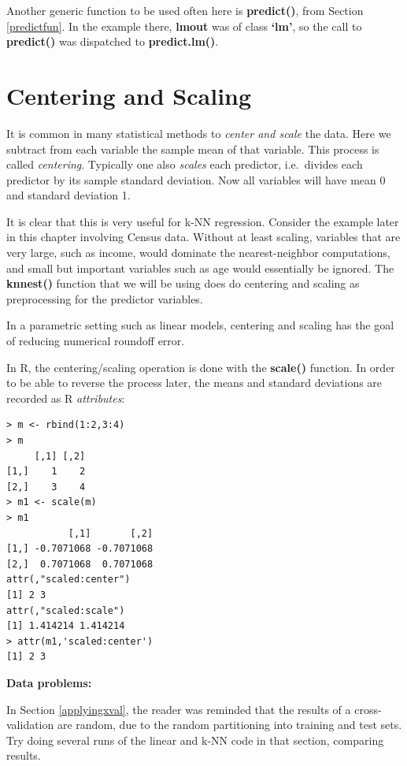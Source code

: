 Another generic function to be used often here is {\bf predict()}, from
Section \ref{predictfun}.  In the example there, {\bf lmout} was of
class {\bf `lm'}, so the call to {\bf predict()} was dispatched to {\bf
predict.lm()}.

\section{Centering and Scaling}
\label{centerscale}

It is common in many statistical methods to {\it center and scale} the
data.  Here we subtract from each variable the sample mean of that
variable.  This process is called {\it centering}.  Typically one also
{\it scales} each predictor, i.e.\ divides each predictor by its sample
standard deviation.  Now all variables will have mean 0 and standard
deviation 1.

It is clear that this is very useful for k-NN regression.
Consider the example later in this chapter involving Census data.
Without at least scaling, variables that are very large, such as income,
would dominate the nearest-neighbor computations, and small but
important variables such as age would essentially be ignored.  The 
{\bf knnest()} function that we will be using does do centering and
scaling as preprocessing for the predictor variables.

In a parametric setting such as linear models, centering and scaling has
the goal of reducing numerical roundoff error.  

In R, the centering/scaling operation is done with the {\bf scale()}
function.  In order to be able to reverse the process later, the means
and standard deviations are recorded as R {\it attributes}:

\begin{lstlisting}
> m <- rbind(1:2,3:4)
> m
     [,1] [,2]
[1,]    1    2
[2,]    3    4
> m1 <- scale(m)
> m1
           [,1]       [,2]
[1,] -0.7071068 -0.7071068
[2,]  0.7071068  0.7071068
attr(,"scaled:center")
[1] 2 3
attr(,"scaled:scale")
[1] 1.414214 1.414214
> attr(m1,'scaled:center')
[1] 2 3
\end{lstlisting}

\startproblemset

{\bf Data problems:}

\oneproblem
\label{randomxval}
In Section \ref{applyingxval}, the reader was reminded that the results
of a cross-validation are random, due to the random partitioning into
training and test sets.  Try doing several runs of the linear and k-NN
code in that section, comparing results.


